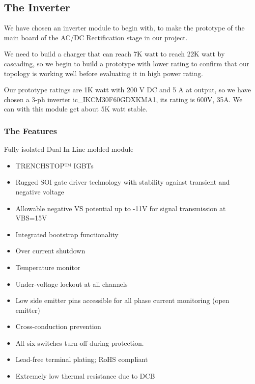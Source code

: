 \documentclass[12pt,a4paper]{book}
\begin{document}
\subsection{The Inverter}
We have chosen an inverter module to begin with, to make the prototype of the main board of the AC/DC Rectification stage in our project.

We need to build a charger that can reach 7K watt to reach 22K watt by cascading, so we begin to build a prototype with lower rating to confirm that our topology is working well before evaluating it in high power rating.

Our prototype ratings are 1K watt with 200 V DC and 5 A at output, so we have chosen a 3-ph inverter ic\_IKCM30F60GDXKMA1, its rating is 600V, 35A. We can with this module get about 5K watt stable.

\subsubsection{The Features}
Fully isolated Dual In-Line molded module
\begin{itemize}
  \item TRENCHSTOP™ IGBTs
  \item	Rugged SOI gate driver technology with stability against transient and negative voltage
  \item	Allowable negative VS potential up to -11V for signal transmission at VBS=15V
  \item	Integrated bootstrap functionality
  \item	Over current shutdown
  \item	Temperature monitor
  \item	Under-voltage lockout at all channels
  \item	Low side emitter pins accessible for all phase current monitoring (open emitter)
  \item	Cross-conduction prevention
  \item	All six switches turn off during protection.
  \item	Lead-free terminal plating; RoHS compliant
  \item	Extremely low thermal resistance due to DCB
\end{itemize}
\end{document}
